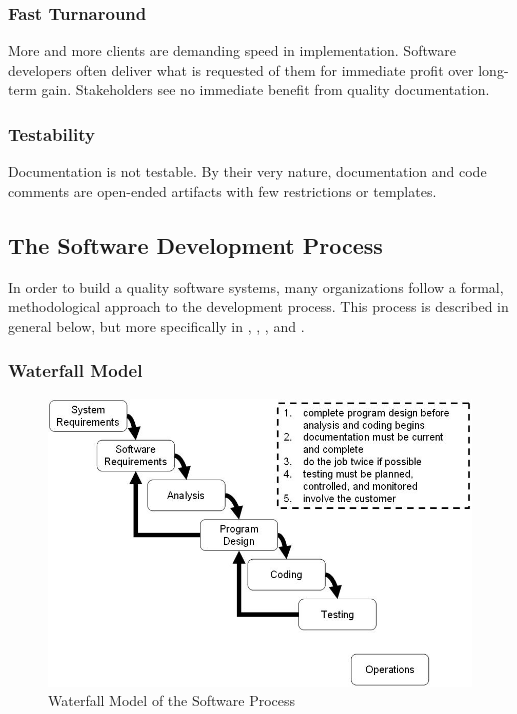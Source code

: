 \subsubsection*{Fast Turnaround}

More and more clients are demanding speed in implementation. Software developers
often deliver what is requested of them for immediate profit over long-term
gain. Stakeholders see no immediate benefit from quality documentation.

\subsubsection*{Testability}

Documentation is not testable. By their very nature, documentation and code
comments are open-ended artifacts with few restrictions or templates.

\subsection{The Software Development Process}
In order to build a quality software systems, many organizations follow a
formal, methodological approach to the development process. This process is
described in general below, but more specifically in \cite{Royce1970},
\cite{Boehm1986}, \cite{CMM11}, and \cite{Kehoe1996}.

\subsubsection{Waterfall Model}\label{waterfall}

\begin{figure}[t]
\begin{center}
\includegraphics[scale=0.66]{images/waterfall.jpg}
\end{center}
\caption{Waterfall Model of the Software Process}
\label{fig:waterfall}
\end{figure}

